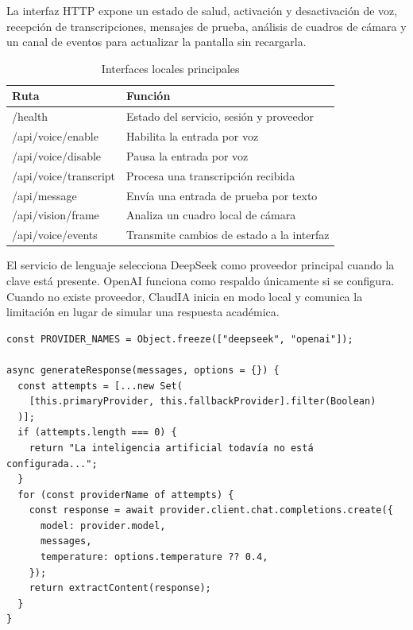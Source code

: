 \documentclass[11pt]{article}
\newcommand{\Section}[1]{\par\vspace{0.16\baselineskip}{\normalfont\normalsize\bfseries\RaggedRight #1\par}}
\begin{document}
\clearpage

\Section{Anexo D. Interfaces y proveedor de IA}

La interfaz HTTP expone un estado de salud, activación y desactivación de voz, recepción de transcripciones, mensajes de prueba, análisis de cuadros de cámara y un canal de eventos para actualizar la pantalla sin recargarla.

\begin{table}[H]
\centering
\caption{Interfaces locales principales}
\begin{tabularx}{\textwidth}{@{}>{\ttfamily\small}p{1.63in}>{\raggedright\arraybackslash}X@{}}
\toprule
\normalfont\textbf{Ruta} & \textbf{Función} \\
\midrule
/health & Estado del servicio, sesión y proveedor \\
/api/voice/enable & Habilita la entrada por voz \\
/api/voice/disable & Pausa la entrada por voz \\
/api/voice/transcript & Procesa una transcripción recibida \\
/api/message & Envía una entrada de prueba por texto \\
/api/vision/frame & Analiza un cuadro local de cámara \\
/api/voice/events & Transmite cambios de estado a la interfaz \\
\bottomrule
\end{tabularx}
\end{table}

El servicio de lenguaje selecciona DeepSeek como proveedor principal cuando la clave está presente. OpenAI funciona como respaldo únicamente si se configura. Cuando no existe proveedor, ClaudIA inicia en modo local y comunica la limitación en lugar de simular una respuesta académica.

\begin{lstlisting}
const PROVIDER_NAMES = Object.freeze(["deepseek", "openai"]);

async generateResponse(messages, options = {}) {
  const attempts = [...new Set(
    [this.primaryProvider, this.fallbackProvider].filter(Boolean)
  )];
  if (attempts.length === 0) {
    return "La inteligencia artificial todavía no está configurada...";
  }
  for (const providerName of attempts) {
    const response = await provider.client.chat.completions.create({
      model: provider.model,
      messages,
      temperature: options.temperature ?? 0.4,
    });
    return extractContent(response);
  }
}
\end{lstlisting}
\end{document}
